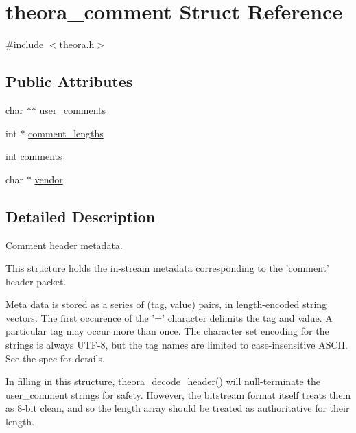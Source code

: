 \hypertarget{structtheora__comment}{\section{theora\+\_\+comment Struct Reference}
\label{structtheora__comment}
}


{\ttfamily \#include $<$theora.\+h$>$}

\subsection*{Public Attributes}
\begin{DoxyCompactItemize}
\item 
char $\ast$$\ast$ \hyperlink{structtheora__comment_a1e236fd180dfce19be89081399444cf5}{user\+\_\+comments}
\item 
int $\ast$ \hyperlink{structtheora__comment_a5ab4a376d3c217282a684577c9c9f49a}{comment\+\_\+lengths}
\item 
int \hyperlink{structtheora__comment_a122393035c8352ff9be42d69e73aee00}{comments}
\item 
char $\ast$ \hyperlink{structtheora__comment_adb371baf8f0daed42af8b875cf8430ef}{vendor}
\end{DoxyCompactItemize}


\subsection{Detailed Description}
Comment header metadata.

This structure holds the in-\/stream metadata corresponding to the 'comment' header packet.

Meta data is stored as a series of (tag, value) pairs, in length-\/encoded string vectors. The first occurence of the '=' character delimits the tag and value. A particular tag may occur more than once. The character set encoding for the strings is always U\+T\+F-\/8, but the tag names are limited to case-\/insensitive A\+S\+C\+I\+I. See the spec for details.

In filling in this structure, \hyperlink{group__oldfuncs_ga02915e63c1bd733ee291f577a8b75a82}{theora\+\_\+decode\+\_\+header()} will null-\/terminate the user\+\_\+comment strings for safety. However, the bitstream format itself treats them as 8-\/bit clean, and so the length array should be treated as authoritative for their length. 

